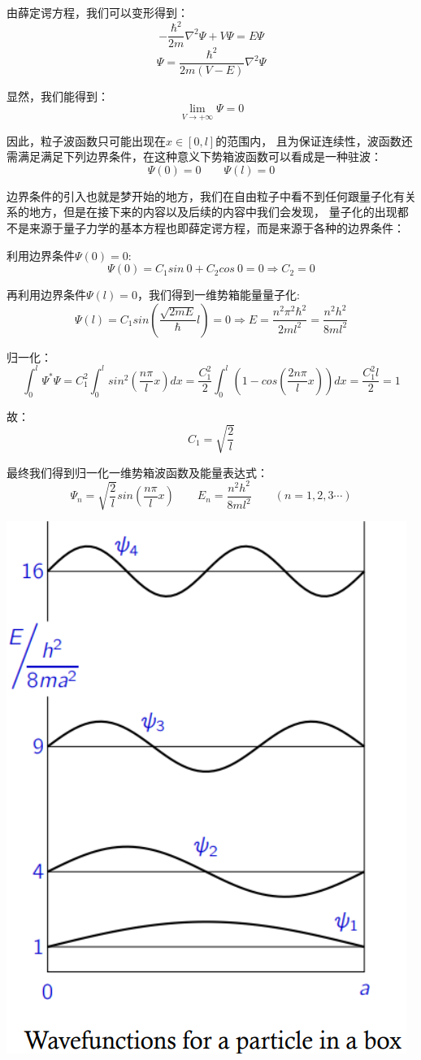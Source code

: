 由薛定谔方程，我们可以变形得到：
\[-\frac{\hbar^2}{2m}\nabla^2\varPsi+V\varPsi=E\varPsi\]
\[\varPsi=\frac{\hbar^2}{2m(V-E)}\nabla^2\varPsi\]

显然，我们能得到：
\[\lim_{V \rightarrow +\infty}\varPsi=0\]

因此，粒子波函数只可能出现在$x \in [0,l]$的范围内，
且为保证连续性，波函数还需满足满足下列边界条件，在这种意义下势箱波函数可以看成是一种驻波：
\[\varPsi(0)=0 \qquad \varPsi(l)=0\]

边界条件的引入也就是梦开始的地方，我们在自由粒子中看不到任何跟量子化有关系的地方，但是在接下来的内容以及后续的内容中我们会发现，
量子化的出现都不是来源于量子力学的基本方程也即薛定谔方程，而是来源于各种的边界条件：

利用边界条件$\varPsi(0)=0$:
\[\varPsi(0)=C_1sin \ 0+C_2cos \ 0=0 \Rightarrow C_2=0\]

再利用边界条件$\varPsi(l)=0$，我们得到一维势箱能量量子化:
\[\varPsi(l)=C_1sin(\frac{\sqrt{2mE}}{\hbar}l)=0 \Rightarrow E=\frac{n^2 \pi^2 \hbar^2}{2ml^2}=\frac{n^2 h^2}{8ml^2}\]

归一化：
\[\int_0^l\varPsi^*\varPsi=C_1^2\int_0^lsin^2\left (\frac{n \pi}{l}x \right )dx=\frac{C_1^2}{2}\int_0^l\left ( 1-cos\left (\frac{2n \pi}{l}x \right ) \right )dx=\frac{C_1^2l}{2}=1\]

故：
\[C_1=\sqrt{\frac{2}{l}}\]

最终我们得到归一化一维势箱波函数及能量表达式：
\[\varPsi_n=\sqrt{\frac{2}{l}}sin\left (\frac{n \pi}{l}x \right ) \qquad E_n=\frac{n^2 h^2}{8ml^2} \qquad (n=1,2,3 \cdots)\]

\begin{center}
    \includegraphics[scale=0.5]{fig/lzhx/微信图片_20211025150139.png}
\end{center}

